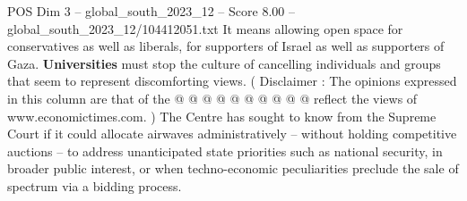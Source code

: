 \begin{textsample}{POS Dim 3 – global\_south\_2023\_12 – Score 8.00 – global\_south\_2023\_12/104412051.txt}
It means allowing open space for conservatives as well as liberals, for supporters of Israel as well as supporters of Gaza. \textbf{Universities} must stop the culture of cancelling individuals and groups that seem to represent discomforting views. ( Disclaimer : The opinions expressed in this column are that of the @ @ @ @ @ @ @ @ @ @ reflect the views of www.economictimes.com. ) The Centre has sought to know from the Supreme Court if it could allocate airwaves administratively -- without holding competitive auctions -- to address unanticipated state priorities such as national security, in broader public interest, or when techno-economic peculiarities preclude the sale of spectrum via a bidding process.

\end{textsample}
